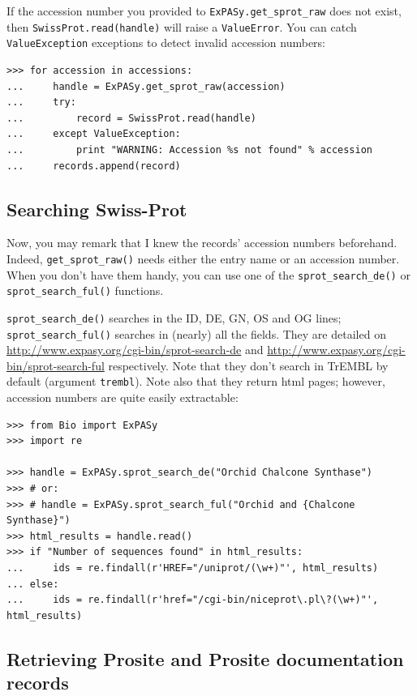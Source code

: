 \documentclass{report}
\begin{document}
If the accession number you provided to \verb|ExPASy.get_sprot_raw| does not exist, then \verb|SwissProt.read(handle)| will raise a \verb|ValueError|. You can catch \verb|ValueException| exceptions to detect invalid accession numbers:

\begin{verbatim}
>>> for accession in accessions:
...     handle = ExPASy.get_sprot_raw(accession)
...     try:
...         record = SwissProt.read(handle)
...     except ValueException:
...         print "WARNING: Accession %s not found" % accession
...     records.append(record)
\end{verbatim}

\subsection{Searching Swiss-Prot}

Now, you may remark that I knew the records' accession numbers
beforehand. Indeed, \verb|get_sprot_raw()| needs either the entry name
or an accession number. When you don't have them handy, you can use
one of the \verb|sprot_search_de()| or \verb|sprot_search_ful()|
functions.

\verb|sprot_search_de()| searches in the ID, DE, GN, OS and OG lines;
\verb|sprot_search_ful()| searches in (nearly) all the fields. They
are detailed on
\url{http://www.expasy.org/cgi-bin/sprot-search-de} and
\url{http://www.expasy.org/cgi-bin/sprot-search-ful}
respectively. Note that they don't search in TrEMBL by default
(argument \verb|trembl|). Note also that they return html pages;
however, accession numbers are quite easily extractable:

\begin{verbatim}
>>> from Bio import ExPASy
>>> import re

>>> handle = ExPASy.sprot_search_de("Orchid Chalcone Synthase")
>>> # or:
>>> # handle = ExPASy.sprot_search_ful("Orchid and {Chalcone Synthase}")
>>> html_results = handle.read()
>>> if "Number of sequences found" in html_results:
...     ids = re.findall(r'HREF="/uniprot/(\w+)"', html_results)
... else:
...     ids = re.findall(r'href="/cgi-bin/niceprot\.pl\?(\w+)"', html_results)
\end{verbatim}

\subsection{Retrieving Prosite and Prosite documentation records}
\end{document}

